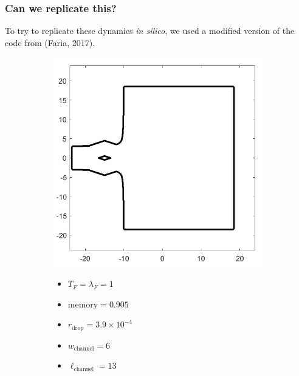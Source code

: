 \documentclass[compress,10pt,usenames,dvipsnames]{beamer}
\theoremstyle{remark}
\begin{document}
\begin{frame}\frametitle{Can we replicate this?}
	To try to replicate these dynamics \emph{in silico}, we used a modified version of the code from (Faria, 2017).
	
	\begin{figure}
		\begin{subfigure}[t]{.5\textwidth}
			\centering
			\includegraphics[scale=0.25]{Figures/setup.png}
			
		\end{subfigure}%
		\begin{subfigure}[t]{.5\textwidth}
			\vspace*{-1.5in}
			\begin{itemize}
				\item $T_F = \lambda_F = 1$
				\item $\text{memory} = 0.905$
				\item $r_\text{drop} = 3.9\times 10^{-4}$
				\item $w_\text{channel} = 6$
				\item $\ell_\text{channel} = 13$
			\end{itemize}
		\end{subfigure}
	\end{figure}
\end{frame}
\end{document}
